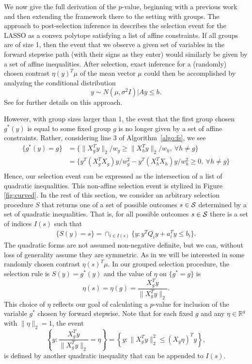\documentclass{imsart}
\newcommand{\real}{\mathbb{R}}
\begin{document}
We now give the full derivation of the $p$-value, beginning with a previous work and then extending the framework there to the setting with groups.
The approach to post-selection inference in \cite{lasso:fixed}
describes the selection event for the LASSO as a convex polytope
satisfying a list of affine constraints.
If all groups are of size 1, then
the event that we observe a given set of variables
in the forward stepwise path (with their signs as they enter) would similarly
be given by a set of affine inequalities.
After selection, exact inference for a (randomly) chosen contrast $\eta(y)^T\mu$ of the mean vector
$\mu$ could then be accomplished by analyzing the conditional distribution
\begin{equation}
y \sim N(\mu, \sigma^2 I) \bigl| Ay \leq b.
\end{equation}
See \cite{lasso:fixed,exact:lars} for further details on this approach.

However, with group sizes larger than 1, the event that the first group
chosen $g^*(y)$ is equal to some fixed group $g$ is no longer given by
a set of affine constraints. Rather, considering line 3 of
Algorithm~\ref{algo:fs}, we see
\begin{equation}
\label{eq:first:quadratic}
\begin{aligned}
\{g^*(y)=g\} &= \{ \|X_g^Ty\|_2 /w_g \geq \|X_h^Ty\|_2 /w_h , \ \forall h \neq g\} \\
&=  \{ y^T(X_g^TX_g)y / w_g^2 - y^T(X_h^TX_h)y / w_h^2 \geq 0, \ \forall h \neq g\} \\
\end{aligned}
\end{equation}
Hence, our selection event can be expressed as 
the intersection of a list of quadratic inequalities. This non-affine selection event is stylized in Figure
\ref{fig:curved}.
In the rest of this section, we consider an arbitrary selection procedure
$S$ that returns one of a set of possible outcomes $s \in {\cal S}$ determined by a set of quadratic inequalities.
That is, for all possible outcomes $s \in {\cal S}$ there is a set of indices
$I(s)$ such that
\begin{equation}
\label{eq:selection}
\begin{aligned}
\{S(y)=s\} = \cap_{i \in I(s)} \{y: y^TQ_iy + a_i^Ty\leq b_i \}.
\end{aligned}
\end{equation}
The quadratic forms are not assumed non-negative definite, but we can, without loss of generality
assume they are symmetric.
As in \cite{lasso:fixed} we will be interested in some randomly chosen contrast
$\eta(s)^T\mu$.
In our grouped selection procedure, the selection rule is $S(y)=g^*(y)$
and the value of $\eta$ on $\{ g^* = g \}$ is
$$
\eta(s) = \eta(g) = \frac{X_{g}^Ty}{\|X_{g}^Ty\|_2}.
$$
This choice of $\eta$ reflects our goal of calculating a $p$-value for inclusion of the variable $g^*$ chosen by forward stepwise.
Note that for each fixed $g$ and any $\eta \in \real^g$ with $\|\eta\|_2=1$, the event 
$$
\left\{y:\frac{X_g^Ty}{\|X_g^Ty\|_2} = \eta \right\} = \left\{y: \|X_g^Ty\|^2_2 \leq (X_g\eta)^Ty \right\},
$$
is defined by another quadratic inequality that can be appended to $I(s)$.
\end{document}
